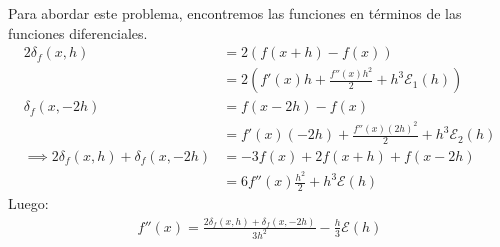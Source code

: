 Para abordar este problema, encontremos las funciones en términos de las funciones diferenciales.
\begin{align*}
    2\delta_f(x,h)&=2(f(x+h)-f(x))\\
    &=2\left(f'(x)h+\frac{f''(x)h^2}{2}+h^3\mathcal{E}_1(h)\right)\\
    \delta_f(x,-2h)&=f(x-2h)-f(x)\\
    &=f'(x)(-2h)+\frac{f''(x)(2h)^2}{2}+h^3\mathcal{E}_2(h)\\
    \implies 2\delta_f(x,h)+\delta_f(x,-2h)&=-3f(x)+2f(x+h)+f(x-2h)\\
    &=6f''(x)\frac{h^2}{2}+h^3\mathcal{E}(h)
\end{align*}
Luego:
\begin{align*}
    f''(x)=\frac{2\delta_f(x,h)+\delta_f(x,-2h)}{3h^2}-\frac{h}{3}\mathcal{E}(h)
\end{align*}

